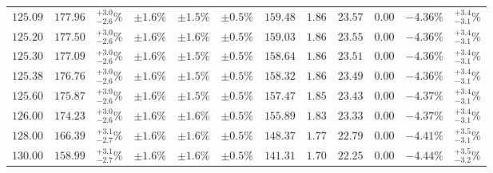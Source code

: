 \begin{landscape}
\begin{table}[ht!]
{\begin{tabular}{| cc | c | ccc | ccccc | c |}
$125.09$ & $177.96$ & $^{+3.0}_{-2.6}\%$ & $\pm 1.6\%$ & {\color{black!55}$\pm 1.5\%$} & {\color{black!55}$\pm 0.5\%$} & $159.48$ & $1.86$ & $23.57$ & $0.00$ & $-4.36\%$ & $^{+3.4}_{-3.1}\%$ \\
$125.20$ & $177.50$ & $^{+3.0}_{-2.6}\%$ & $\pm 1.6\%$ & {\color{black!55}$\pm 1.6\%$} & {\color{black!55}$\pm 0.5\%$} & $159.03$ & $1.86$ & $23.55$ & $0.00$ & $-4.36\%$ & $^{+3.4}_{-3.1}\%$ \\
$125.30$ & $177.09$ & $^{+3.0}_{-2.6}\%$ & $\pm 1.6\%$ & {\color{black!55}$\pm 1.5\%$} & {\color{black!55}$\pm 0.5\%$} & $158.64$ & $1.86$ & $23.51$ & $0.00$ & $-4.36\%$ & $^{+3.4}_{-3.1}\%$ \\
$125.38$ & $176.76$ & $^{+3.0}_{-2.6}\%$ & $\pm 1.6\%$ & {\color{black!55}$\pm 1.5\%$} & {\color{black!55}$\pm 0.5\%$} & $158.32$ & $1.86$ & $23.49$ & $0.00$ & $-4.36\%$ & $^{+3.4}_{-3.1}\%$ \\
$125.60$ & $175.87$ & $^{+3.0}_{-2.6}\%$ & $\pm 1.6\%$ & {\color{black!55}$\pm 1.5\%$} & {\color{black!55}$\pm 0.5\%$} & $157.47$ & $1.85$ & $23.43$ & $0.00$ & $-4.37\%$ & $^{+3.4}_{-3.1}\%$ \\
$126.00$ & $174.23$ & $^{+3.0}_{-2.6}\%$ & $\pm 1.6\%$ & {\color{black!55}$\pm 1.6\%$} & {\color{black!55}$\pm 0.5\%$} & $155.89$ & $1.83$ & $23.33$ & $0.00$ & $-4.37\%$ & $^{+3.4}_{-3.1}\%$ \\
$128.00$ & $166.39$ & $^{+3.1}_{-2.7}\%$ & $\pm 1.6\%$ & {\color{black!55}$\pm 1.6\%$} & {\color{black!55}$\pm 0.5\%$} & $148.37$ & $1.77$ & $22.79$ & $0.00$ & $-4.41\%$ & $^{+3.5}_{-3.1}\%$ \\
$130.00$ & $158.99$ & $^{+3.1}_{-2.7}\%$ & $\pm 1.6\%$ & {\color{black!55}$\pm 1.6\%$} & {\color{black!55}$\pm 0.5\%$} & $141.31$ & $1.70$ & $22.25$ & $0.00$ & $-4.44\%$ & $^{+3.5}_{-3.2}\%$ \\
\cline{1-12}
\end{tabular}
}
\end{table}


\end{landscape}

